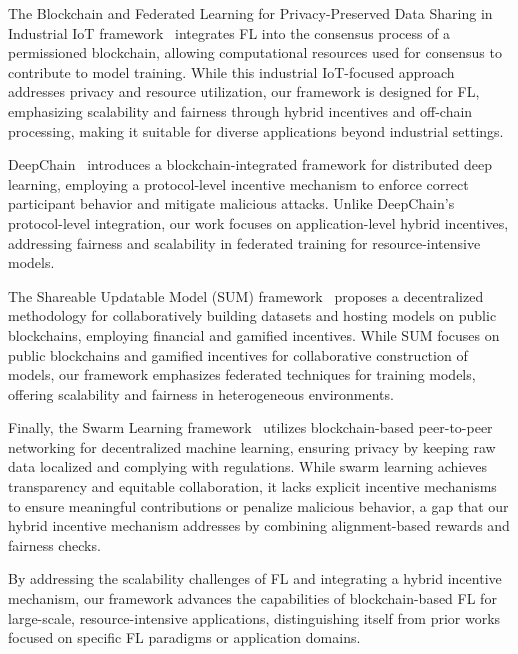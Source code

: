 
The Blockchain and Federated Learning for Privacy-Preserved Data Sharing in Industrial IoT framework~\cite{lu2019blockchain} integrates FL into the consensus process of a permissioned blockchain, allowing computational resources used for consensus to contribute to model training. While this industrial IoT-focused approach addresses privacy and resource utilization, our framework is designed for FL, emphasizing scalability and fairness through hybrid incentives and off-chain processing, making it suitable for diverse applications beyond industrial settings.


DeepChain~\cite{weng2019deepchain} introduces a blockchain-integrated framework for distributed deep learning, employing a protocol-level incentive mechanism to enforce correct participant behavior and mitigate malicious attacks. Unlike DeepChain’s protocol-level integration, our work focuses on application-level hybrid incentives, addressing fairness and scalability in federated training for resource-intensive models.

The Shareable Updatable Model (SUM) framework~\cite{harris2019decentralized,harris2020analysis} proposes a decentralized methodology for collaboratively building datasets and hosting models on public blockchains, employing financial and gamified incentives. While SUM focuses on public blockchains and gamified incentives for collaborative construction of models, our framework emphasizes federated techniques for training models, offering scalability and fairness in heterogeneous environments.

Finally, the Swarm Learning  framework~\cite{hp_swarm_learning} utilizes blockchain-based peer-to-peer networking for decentralized machine learning, ensuring privacy by keeping raw data localized and complying with regulations. While swarm learning achieves transparency and equitable collaboration, it lacks explicit incentive mechanisms to ensure meaningful contributions or penalize malicious behavior, a gap that our hybrid incentive mechanism addresses by combining alignment-based rewards and fairness checks.

By addressing the scalability challenges of FL and integrating a hybrid incentive mechanism, our framework advances the capabilities of blockchain-based FL for large-scale, resource-intensive applications, distinguishing itself from prior works focused on specific FL paradigms or application domains.

